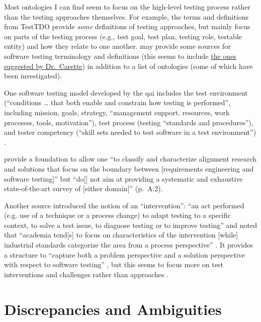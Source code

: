 Most ontologies I can find seem to focus on the high-level testing process
rather than the testing approaches themselves. For example, the terms and
definitions \citep{TebesEtAl2020b}
from TestTDO \citep{TebesEtAl2020a} provide \emph{some} definitions of
testing approaches, but mainly focus on parts of the testing process
(e.g., test goal, test plan, testing role, testable entity) and how they relate
to one another. \citet[pp.~152-153]{TebesEtAl2019} may provide some
sources for software testing terminology and definitions (this seems to include
\href{https://github.com/samm82/TestGen-Thesis/issues/14#issuecomment-1839922715}
{the ones suggested by Dr.~Carette}) in addition to a list of ontologies
(some of which have been investigated).

One software testing model developed by the \acf{qai} includes the test
environment (``conditions \dots
that both enable and constrain how testing is performed'', including mission,
goals, strategy, ``management support, resources, work processes, tools,
motivation''), test process (testing ``standards and procedures''), and tester
competency (``skill sets needed to test software in a test environment'')
\citep[pp.~5-6]{Perry2006}.

\citet{UnterkalmsteinerEtAl2014} provide a foundation to allow one ``to
classify and characterize alignment research and solutions that focus on the
boundary between [requirements engineering and software testing]'' but ``do[]
not aim at providing a systematic and exhaustive state-of-the-art survey of
      [either domain]'' (p.~A:2).

Another source
introduced the notion of an ``intervention'': ``an act performed (e.g. use of a
technique or a process change) to adapt testing
to a specific context, to solve
a test issue, to diagnose testing or to improve testing''
\citep[p.~1]{engström_mapping_2015} and noted that ``academia tend[s] to focus on
characteristics of the intervention [while] industrial standards categorize the
area from a process perspective'' \citep[p.~2]{engström_mapping_2015}.
It provides a structure to ``capture both a problem perspective and a solution
perspective with respect to software testing'' \citep[pp.~3-4]{engström_mapping_2015},
but this seems to focus more on test interventions and challenges rather than
approaches \citep[Fig.~5]{engström_mapping_2015}.

\section{Discrepancies and Ambiguities}

